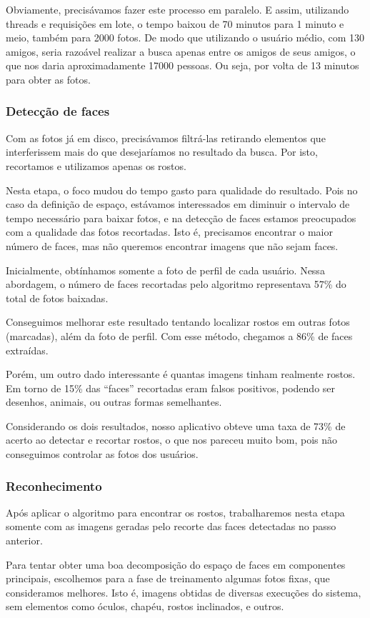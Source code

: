 \documentclass[10pt,a4paper]{article}
\begin{document}
	Obviamente, precisávamos fazer este processo em paralelo. E assim, utilizando threads e requisições em lote, o tempo baixou de 70 minutos para 1 minuto e meio, também para 2000 fotos. De modo que utilizando o usuário médio, com 130 amigos, seria razoável realizar a busca apenas entre os amigos de seus amigos, o que nos daria aproximadamente 17000 pessoas. Ou seja, por volta de 13 minutos para obter as fotos.
\subsubsection*{Detecção de faces} 
	Com as fotos já em disco, precisávamos filtrá-las retirando elementos que interferissem mais do que desejaríamos no resultado da busca. Por isto, recortamos e utilizamos apenas os rostos.

	Nesta etapa, o foco mudou do tempo gasto para qualidade do resultado. Pois no caso da definição de espaço, estávamos interessados em diminuir o intervalo de tempo necessário para baixar fotos, e na detecção de faces estamos preocupados com a qualidade das fotos recortadas. Isto é, precisamos encontrar o maior número de faces, mas não queremos encontrar imagens que não sejam faces.

	Inicialmente, obtínhamos somente a foto de perfil de cada usuário. Nessa abordagem, o número de faces recortadas pelo algoritmo representava 57\% do total de fotos baixadas.

	Conseguimos melhorar este resultado tentando localizar rostos em outras fotos (marcadas), além da foto de perfil. Com esse método, chegamos a 86\% de faces extraídas.

	Porém, um outro dado interessante é quantas imagens tinham realmente rostos. Em torno de 15\% das “faces” recortadas eram falsos positivos, podendo ser desenhos, animais, ou outras formas semelhantes.

	Considerando os dois resultados, nosso aplicativo obteve uma taxa de 73\% de acerto ao detectar e recortar rostos, o que nos pareceu muito bom, pois não conseguimos controlar as fotos dos usuários.
\subsubsection*{Reconhecimento}
	Após aplicar o algoritmo para encontrar os rostos, trabalharemos nesta etapa somente com as imagens geradas pelo recorte das faces detectadas no passo anterior. 

	Para tentar obter uma boa decomposição do espaço de faces em
        componentes principais, escolhemos para a fase de treinamento
        algumas fotos fixas, que consideramos melhores. Isto é,
        imagens obtidas de diversas execuções do sistema, sem
        elementos como óculos, chapéu, rostos inclinados, e outros.
\end{document}
